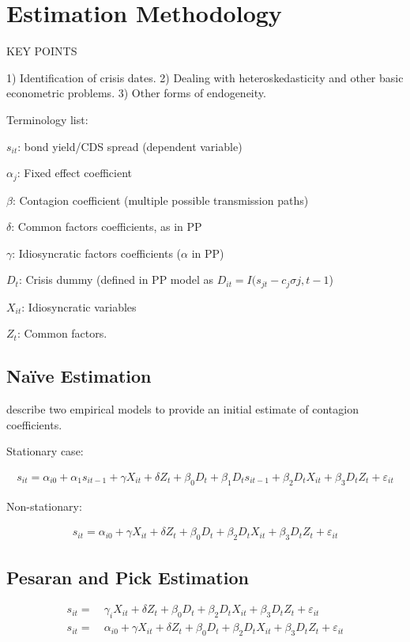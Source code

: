 \documentclass[../base.tex]{subfiles}
\begin{document}
\section{Estimation Methodology}
\label{est}


KEY POINTS

1) Identification of crisis dates.
2) Dealing with heteroskedasticity and other basic econometric problems. 
3) Other forms of endogeneity. 


Terminology list:

$s_{it}$: bond yield/CDS spread (dependent variable)

$\alpha_j$: Fixed effect coefficient

$\beta$: Contagion coefficient (multiple possible transmission paths)

$\delta$: Common factors coefficients, as in PP

$\gamma$: Idiosyncratic factors coefficients ($\alpha$ in PP)

$D_t$: Crisis dummy (defined in PP model as $D_{it} = I(s_{jt} - c_j\sigma{j, t-1}$)

$X_{it}$: Idiosyncratic variables

$Z_t$: Common factors. 

\subsection{Na\"{i}ve Estimation}

\cite{giordano2013pure} describe two empirical models to provide an initial estimate of contagion coefficients. 

Stationary case:

\begin{align}
	s_{it} = \alpha_{i0} + \alpha_{1}s_{it-1} +\gamma X_{it} + \delta Z_t + \beta_0D_t + \beta_1D_ts_{it-1} + \beta_2D_tX_{it} + \beta_3D_tZ_t + \varepsilon_{it}
\end{align}

Non-stationary:

\begin{align}
	s_{it} = \alpha_{i0} + \gamma X_{it} + \delta Z_t + \beta_0D_t + \beta_2D_tX_{it} + \beta_3D_tZ_t + \varepsilon_{it}
\end{align}


\subsection{Pesaran and Pick Estimation}
\label{pp}

\begin{align}
	s_{it} =&~\gamma_i X_{it} + \delta Z_t + \beta_0D_t + \beta_2D_tX_{it} + \beta_3D_tZ_t + \varepsilon_{it} \\
	s_{it} =&~\alpha_{i0} + \gamma X_{it} + \delta Z_t + \beta_0D_t + \beta_2D_tX_{it} + \beta_3D_tZ_t + \varepsilon_{it} 
\end{align}
\end{document}
